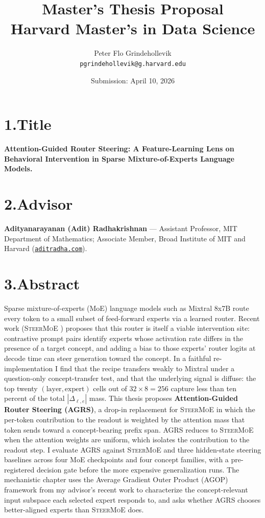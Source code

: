 \documentclass[11pt]{article}
\title{\textbf{Master's Thesis Proposal}\\[2pt]
  \large Harvard Master's in Data Science}
\date{Submission: April 10, 2026}
\author{Peter Flo Grindehollevik \\ \texttt{pgrindehollevik@g.harvard.edu}}
\begin{document}
\maketitle

\section*{1.\quad Title}
\textbf{Attention-Guided Router Steering: A Feature-Learning Lens on
Behavioral Intervention in Sparse Mixture-of-Experts Language Models.}

\section*{2.\quad Advisor}
\textbf{Adityanarayanan (Adit) Radhakrishnan} ---
Assistant Professor, MIT Department of Mathematics; Associate Member,
Broad Institute of MIT and Harvard
(\href{https://aditradha.com}{\texttt{aditradha.com}}).

\section*{3.\quad Abstract}

Sparse mixture-of-experts (MoE) language models such as Mixtral 8x7B
route every token to a small subset of feed-forward experts via a
learned router. Recent work
(\textsc{SteerMoE} \citep{steermoe2025}) proposes that this
router is itself a viable intervention site: contrastive prompt pairs
identify experts whose activation rate differs in the presence of a
target concept, and adding a bias to those experts' router logits at
decode time can steer generation toward the concept. In a faithful
re-implementation I find that the recipe transfers weakly to Mixtral
under a question-only concept-transfer test, and that the underlying
signal is diffuse: the top twenty
$(\text{layer}, \text{expert})$ cells out of $32 \times 8 = 256$
capture less than ten percent of the total $|\Delta_{\ell,e}|$ mass.
This thesis proposes \textbf{Attention-Guided Router Steering (AGRS)},
a drop-in replacement for \textsc{SteerMoE} in which the per-token
contribution to the readout is weighted by the attention mass that
token sends toward a concept-bearing prefix span. AGRS reduces to
\textsc{SteerMoE} when the attention weights are uniform, which
isolates the contribution to the readout step. I evaluate AGRS against
\textsc{SteerMoE} and three hidden-state steering baselines across
four MoE checkpoints and four concept families, with a pre-registered
decision gate before the more expensive generalization runs. The
mechanistic chapter uses the Average Gradient Outer Product (AGOP)
framework from my advisor's recent work to characterize the
concept-relevant input subspace each selected expert responds to, and
asks whether AGRS chooses better-aligned experts than
\textsc{SteerMoE} does.
\end{document}
